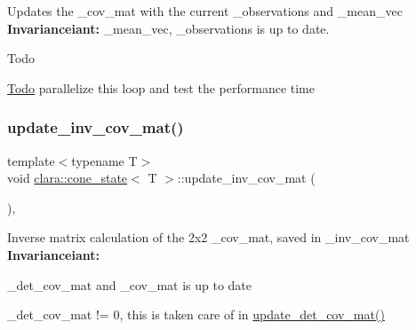Updates the {\ttfamily \+\_\+cov\+\_\+mat} with the current {\ttfamily \+\_\+observations} and {\ttfamily \+\_\+mean\+\_\+vec} {\bfseries Invarianceiant\+:} {\ttfamily \+\_\+mean\+\_\+vec}, {\ttfamily \+\_\+observations} is up to date. 

\begin{DoxyRefDesc}{Todo}
\item[\hyperlink{todo__todo000008}{Todo}]parallelize this loop and test the performance time \end{DoxyRefDesc}
\mbox{\label{classclara_1_1cone__state_a7b0d6ab972d3d003eaad439c630c1c73}} 
\subsubsection{\texorpdfstring{update\+\_\+inv\+\_\+cov\+\_\+mat()}{update\_inv\_cov\_mat()}}
{\footnotesize\ttfamily template$<$typename T$>$ \\
void \hyperlink{classclara_1_1cone__state}{clara\+::cone\+\_\+state}$<$ T $>$\+::update\+\_\+inv\+\_\+cov\+\_\+mat (\begin{DoxyParamCaption}{ }\end{DoxyParamCaption})\hspace{0.3cm}{\ttfamily [inline]}, {\ttfamily [private]}}



Inverse matrix calculation of the 2x2 {\ttfamily \+\_\+cov\+\_\+mat}, saved in {\ttfamily \+\_\+inv\+\_\+cov\+\_\+mat} {\bfseries Invarianceiant\+:} 


\begin{DoxyItemize}
\item {\ttfamily \+\_\+det\+\_\+cov\+\_\+mat} and {\ttfamily \+\_\+cov\+\_\+mat} is up to date
\item {\ttfamily \+\_\+det\+\_\+cov\+\_\+mat} != 0, this is taken care of in {\ttfamily \hyperlink{classclara_1_1cone__state_ac04710abc3eba0e3688c70eaeab3f2ce}{update\+\_\+det\+\_\+cov\+\_\+mat()}} 
\end{DoxyItemize}\mbox{\label{classclara_1_1cone__state_ada683dbedcee79d84db8255ee5e71e6e}} 
